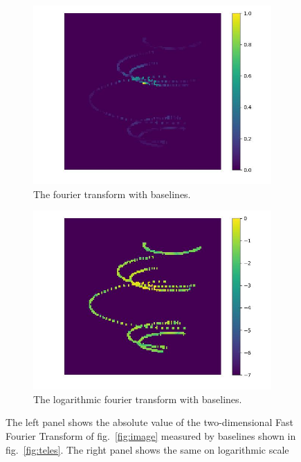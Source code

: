 \documentclass[fleqn,usenatbib,twocolumn]{mnras}
\begin{document}
\begin{figure}
	\centering
	\begin{subfigure}{0.5\linewidth}
		\includegraphics[width=\linewidth]{../fig/ft/ft_base.jpg}
		\caption{The fourier transform with baselines.}
	\end{subfigure}\hfill
	\begin{subfigure}{0.5\linewidth}
		\includegraphics[width=\linewidth]{../fig/ft/ft_log_base.jpg}
		\caption{The logarithmic fourier transform with baselines.}
	\end{subfigure}
	\caption{The left panel shows the absolute value of the two-dimensional Fast Fourier Transform of fig.~\ref{fig:image} measured by baselines shown in fig.~\ref{fig:teles}. The right panel shows the same on logarithmic scale}
	\label{fig:ft_base}
\end{figure}
\end{document}
